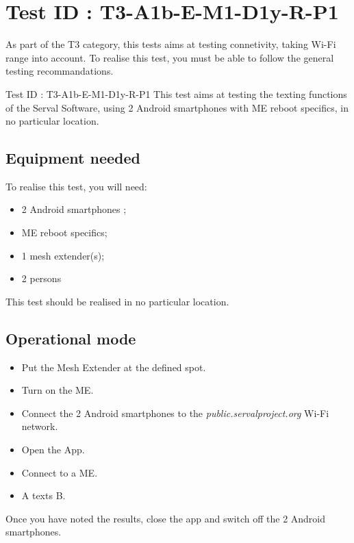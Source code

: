 \documentclass[oneside]{book}
\begin{document}
\section{Test ID : T3-A1b-E-M1-D1y-R-P1}
\begin{itshape}
As part of the T3 category, this tests aims at testing connetivity, taking Wi-Fi range into account.
To realise this test, you must be able to follow the general testing recommandations.
\end{itshape}
\newline
Test ID : T3-A1b-E-M1-D1y-R-P1
 This test aims at testing the texting functions of the Serval Software, using 2 Android smartphones with ME reboot specifics, in no particular location.
\subsection{Equipment needed} To realise this test, you will need:
\begin{itemize}
\item 2 Android smartphones ;
\item ME reboot specifics;
\item 1 mesh extender(s);
\item 2 persons
\end{itemize}
This test should be realised in no particular location.
\subsection{Operational mode} \begin{itemize}
\item Put the Mesh Extender at the defined spot.
\item Turn on the ME.
\item Connect the 2 Android smartphones to the \emph{public.servalproject.org} Wi-Fi network.
\item Open the App.
\item Connect to a ME.
\item A texts B.
\end{itemize}
Once you have noted the results, close the app and switch off the 2 Android smartphones.
\end{document}

